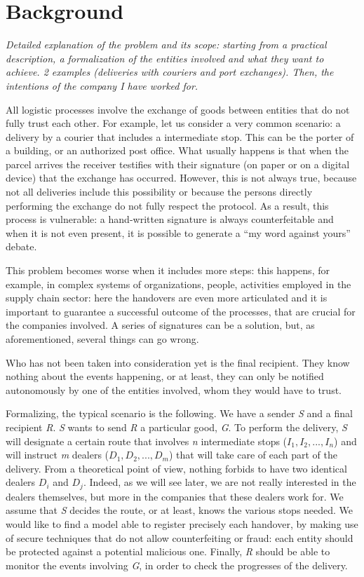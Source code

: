 \chapter{Background}
\label{cha:background}
\textit{Detailed explanation of the problem and its scope: starting from a practical description, a formalization of the entities involved and what they want to achieve. 2 examples (deliveries with couriers and port exchanges). Then, the intentions of the company I have worked for.}

All logistic processes involve the exchange of goods between entities that do not fully trust each other. For example, let us consider a very common scenario: a delivery by a courier that includes a intermediate stop. This can be the porter of a building, or an authorized post office. What usually happens is that when the parcel arrives the receiver testifies with their signature (on paper or on a digital device) that the exchange has occurred. However, this is not always true, because not all deliveries include this possibility or because the persons directly performing the exchange do not fully respect the protocol. As a result, this process is vulnerable: a hand-written signature is always counterfeitable and when it is not even present, it is possible to generate a ``my word against yours'' debate.

This problem becomes worse when it includes more steps: this happens, for example, in complex systems of organizations, people, activities employed in the supply chain sector: here the handovers are even more articulated and it is important to guarantee a successful outcome of the processes, that are crucial for the companies involved. A series of signatures can be a solution, but, as aforementioned, several things can go wrong.

Who has not been taken into consideration yet is the final recipient. They know nothing about the events happening, or at least, they can only be notified autonomously by one of the entities involved, whom they would have to trust. 

Formalizing, the typical scenario is the following. We have a sender \textit{S} and a final recipient \textit{R}. \textit{S} wants to send \textit{R} a particular good, \textit{G}. To perform the delivery, \textit{S} will designate a certain route that involves \textit{n} intermediate stops ($I_1, I_2, ..., I_n$) and will instruct \textit{m} dealers ($D_1, D_2, ..., D_m$) that will take care of each part of the delivery. From a theoretical point of view, nothing forbids to have two identical dealers $D_i$ and $D_j$. Indeed, as we will see later, we are not really interested in the dealers themselves, but more in the companies that these dealers work for. We assume that \textit{S} decides the route, or at least, knows the various stops needed. We would like to find a model able to register precisely each handover, by making use of secure techniques that do not allow counterfeiting or fraud: each entity should be protected against a potential malicious one. Finally, \textit{R} should be able to monitor the events involving \textit{G}, in order to check the progresses of the delivery.

